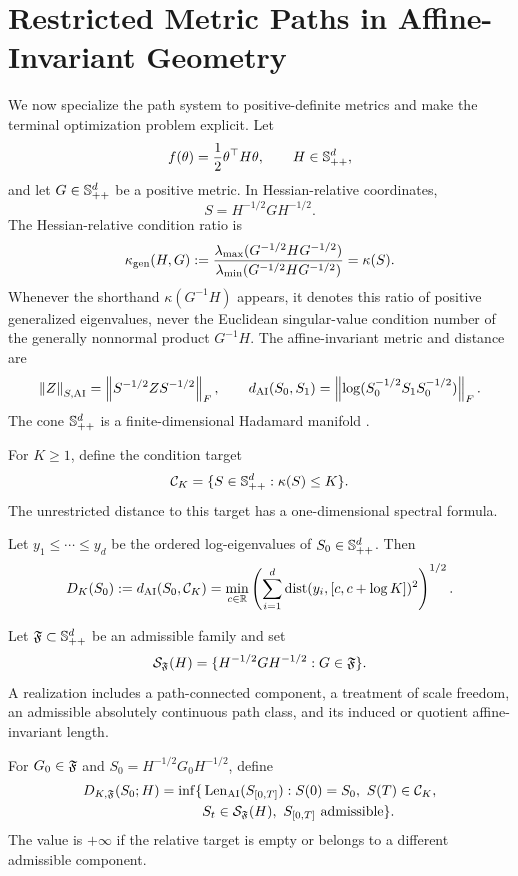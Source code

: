 \section{Restricted Metric Paths in Affine-Invariant Geometry}
\label{sec:spd-rdgc}

We now specialize the path system to positive-definite metrics and make the
terminal optimization problem explicit.  Let
\[
  f(\theta)=\frac12\theta^\top H\theta,
  \qquad H\in\mathbb S_{++}^d,
\]
and let \(G\in\mathbb S_{++}^d\) be a positive metric.  In Hessian-relative
coordinates,
\[
  S=H^{-1/2}GH^{-1/2}.
\]
The Hessian-relative condition ratio is
\[
  \kappa_{\rm gen}(H,G)
  :=\frac{\lambda_{\max}(G^{-1/2}HG^{-1/2})}
  {\lambda_{\min}(G^{-1/2}HG^{-1/2})}
  =\kappa(S).
\]
Whenever the shorthand \(\kappa(G^{-1}H)\) appears, it denotes this ratio of
positive generalized eigenvalues, never the Euclidean singular-value
condition number of the generally nonnormal product \(G^{-1}H\).
The affine-invariant metric and distance are
\[
  \left\lVert Z\right\rVert_{S,\mathrm{AI}}
  =\left\lVert S^{-1/2}ZS^{-1/2}\right\rVert_F,
  \qquad
  d_{\mathrm{AI}}(S_0,S_1)
  =\left\lVert \log(S_0^{-1/2}S_1S_0^{-1/2})\right\rVert_F.
\]
The cone \(\mathbb S_{++}^d\) is a finite-dimensional Hadamard manifold
\cite{bhatia2007positive,pennec2006riemannian}.

For \(K\ge1\), define the condition target
\[
  \mathcal C_K=\{S\in\mathbb S_{++}^d:\kappa(S)\le K\}.
\]
The unrestricted distance to this target has a one-dimensional spectral
formula.

\begin{theorem}
\label{thm:full-spd-benchmark}
Let \(y_1\le\cdots\le y_d\) be the ordered log-eigenvalues of
\(S_0\in\mathbb S_{++}^d\).  Then
\[
  D_K(S_0)
  :=d_{\mathrm{AI}}(S_0,\mathcal C_K)
  =
  \min_{c\in\mathbb R}
  \left(
  \sum_{i=1}^d\operatorname{dist}(y_i,[c,c+\log K])^2
  \right)^{1/2}.
\]
\end{theorem}

Let \(\mathfrak F\subset\mathbb S_{++}^d\) be an admissible family and set
\[
  \mathcal S_\mathfrak F(H)
  =
  \{H^{-1/2}GH^{-1/2}:G\in\mathfrak F\}.
\]
A realization includes a path-connected component, a treatment of scale
freedom, an admissible absolutely continuous path class, and its induced or
quotient affine-invariant length.

\begin{definition}
\label{def:restricted-complexity}
For \(G_0\in\mathfrak F\) and \(S_0=H^{-1/2}G_0H^{-1/2}\), define
\[
\begin{aligned}
  D_{K,\mathfrak F}(S_0;H)
  =
  \inf\{&\operatorname{Len}_{\mathrm{AI}}(S_{[0,T]}):
  S(0)=S_0,\ S(T)\in\mathcal C_K,\\
  &S_t\in\mathcal S_\mathfrak F(H),
  \ S_{[0,T]}\text{ admissible}\}.
\end{aligned}
\]
The value is \(+\infty\) if the relative target is empty or belongs to a
different admissible component.
\end{definition}

